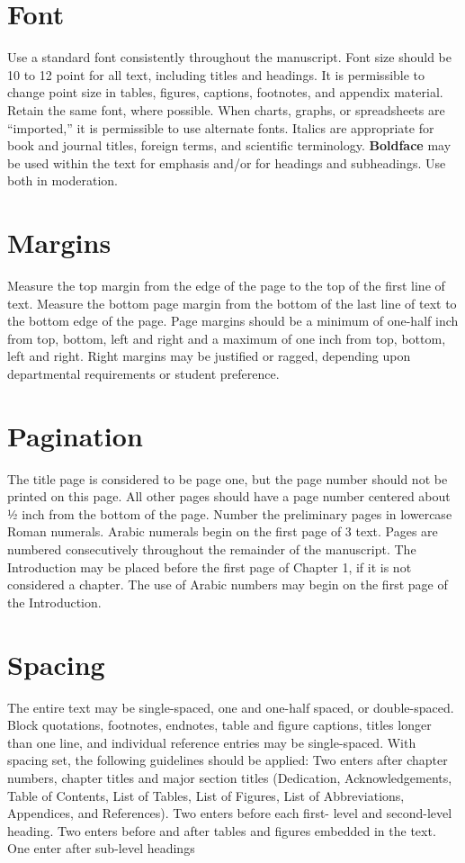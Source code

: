 \section{Font}
Use a standard font consistently throughout the manuscript. Font size should be 10 to 12 point for all text, including titles and headings. It is permissible to change point size in tables, figures, captions, footnotes, and appendix material. Retain the same font, where possible. When charts, graphs, or spreadsheets are “imported,” it is permissible to use alternate fonts. Italics are appropriate for book and journal titles, foreign terms, and scientific terminology. \textbf{Boldface} may be used within the text for emphasis and/or for headings and subheadings. Use both in moderation. 

\section{Margins}
Measure the top margin from the edge of the page to the top of the first line of text. Measure the bottom page margin from the bottom of the last line of text to the bottom edge of the page. Page margins should be a minimum of one-half inch from top, bottom, left and right and a maximum of one inch from top, bottom, left and right. Right margins may be justified or ragged, depending upon departmental requirements or student preference. 

\section{Pagination}
The title page is considered to be page one, but the page number should not be printed on this page. All other pages should have a page number centered about ½ inch from the bottom of the page. Number the preliminary pages in lowercase Roman numerals. Arabic numerals begin on the first page of 3 text. Pages are numbered consecutively throughout the remainder of the manuscript. The Introduction may be placed before the first page of Chapter 1, if it is not considered a chapter. The use of Arabic numbers may begin on the first page of the Introduction. 


\section{Spacing}
The entire text may be single-spaced, one and one-half spaced, or double-spaced. Block quotations, footnotes, endnotes, table and figure captions, titles longer than one line, and individual reference entries may be single-spaced. With spacing set, the following guidelines should be applied: Two enters after chapter numbers, chapter titles and major section titles (Dedication, Acknowledgements, Table of Contents, List of Tables, List of Figures, List of Abbreviations, Appendices, and References). Two enters before each first- level and second-level heading. Two enters before and after tables and figures embedded in the text. One enter after sub-level headings


